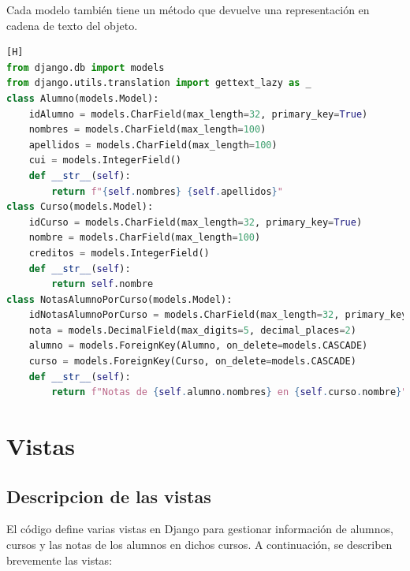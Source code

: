 \documentclass{article}
\begin{document}
Cada modelo también tiene un método que devuelve una representación en cadena de texto del objeto.

    \begin{lstlisting}[language=Python,caption={models.py}][H]
from django.db import models
from django.utils.translation import gettext_lazy as _
class Alumno(models.Model):
    idAlumno = models.CharField(max_length=32, primary_key=True)
    nombres = models.CharField(max_length=100)
    apellidos = models.CharField(max_length=100)
    cui = models.IntegerField()
    def __str__(self):
        return f"{self.nombres} {self.apellidos}"
class Curso(models.Model):
    idCurso = models.CharField(max_length=32, primary_key=True)
    nombre = models.CharField(max_length=100)
    creditos = models.IntegerField()
    def __str__(self):
        return self.nombre
class NotasAlumnoPorCurso(models.Model):
    idNotasAlumnoPorCurso = models.CharField(max_length=32, primary_key=True)
    nota = models.DecimalField(max_digits=5, decimal_places=2)
    alumno = models.ForeignKey(Alumno, on_delete=models.CASCADE)
    curso = models.ForeignKey(Curso, on_delete=models.CASCADE)
    def __str__(self):
        return f"Notas de {self.alumno.nombres} en {self.curso.nombre}"

    \end{lstlisting}

            
    \section {Vistas}

\subsection{Descripcion de las vistas}
El código define varias vistas en Django para gestionar información de alumnos, cursos y las notas de los alumnos en dichos cursos. A continuación, se describen brevemente las vistas:
\end{document}
